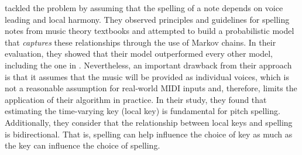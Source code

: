 \textcite{teodoru2007pitch} tackled the problem by assuming
that the spelling of a note depends on voice leading and
local harmony. They observed principles and guidelines for
spelling notes from music theory textbooks
\parencite{aldwell1978harmony,rimskykorsakov2005practical}
and attempted to build a probabilistic model that
\emph{captures} these relationships through the use of
Markov chains. In their evaluation, they showed that their
model outperformed every other model, including the one in
\textcite{meredith2006ps13}. Nevertheless, an important
drawback from their approach is that it assumes that the
music will be provided as individual voices, which is not a
reasonable assumption for real-world MIDI inputs and,
therefore, limits the application of their algorithm in
practice. In their study, they found that estimating the
time-varying key (local key) is fundamental for pitch
spelling. Additionally, they consider that the relationship
between local keys and spelling is bidirectional. That is,
spelling can help influence the choice of key as much as the
key can influence the choice of spelling.
